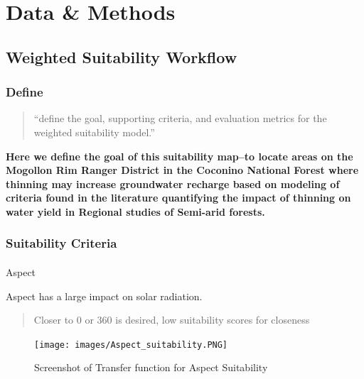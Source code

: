 \documentclass[
  number]{elsarticle}
\makeatletter
\let\oldparagraph\paragraph
\renewcommand{\paragraph}{
    \@ifstar
      \xxxParagraphStar
      \xxxParagraphNoStar
  }
\newcommand{\xxxParagraphStar}[1]{\oldparagraph*{#1}\mbox{}}
\newcommand{\xxxParagraphNoStar}[1]{\oldparagraph{#1}\mbox{}}
\makeatother
\begin{document}
\section{Data \& Methods}\label{sec-data-methods}

\subsection{Weighted Suitability
Workflow}\label{weighted-suitability-workflow}

\subsubsection{Define}\label{define}

\begin{quote}
``define the goal, supporting criteria, and evaluation metrics for the
weighted suitability model.''
\end{quote}

\textbf{Here we define the goal of this suitability map--to locate areas
on the Mogollon Rim Ranger District in the Coconino National Forest
where thinning may increase groundwater recharge based on modeling of
criteria found in the literature quantifying the impact of thinning on
water yield in Regional studies of Semi-arid forests.}

\subsubsection{Suitability Criteria}\label{suitability-criteria}

\paragraph{Aspect}\label{aspect}

Aspect has a large impact on solar radiation.

\begin{quote}
Closer to 0 or 360 is desired, low suitability scores for closeness
\end{quote}

\begin{figure}[H]

{\centering \texttt{[image: images/Aspect\_suitability.PNG]}

}

\caption{Screenshot of Transfer function for Aspect Suitability}

\end{figure}%
\end{document}
